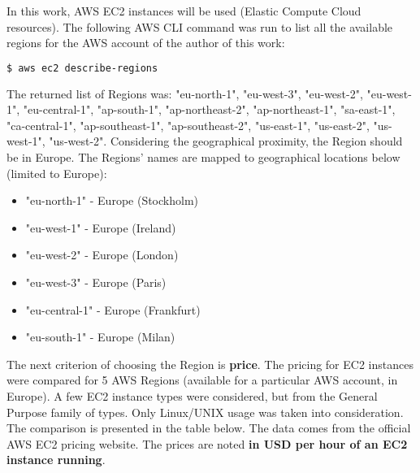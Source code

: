 In this work, AWS EC2 instances will be used (Elastic Compute Cloud resources). The following AWS CLI command was run to list all the available regions for the AWS account of the author of this work:
\begin{lstlisting}[basicstyle=\small,caption={A command of AWS CLI tool used to list all the available regions (for an AWS account)},captionpos=b,language=Bash,xleftmargin=1cm]
$ aws ec2 describe-regions
\end{lstlisting}

The returned list of Regions was: "eu-north-1", "eu-west-3", "eu-west-2", "eu-west-1", "eu-central-1", "ap-south-1", "ap-northeast-2", "ap-northeast-1", "sa-east-1", "ca-central-1", "ap-southeast-1", "ap-southeast-2", "us-east-1", "us-east-2", "us-west-1", "us-west-2". Considering the geographical proximity, the Region should be in Europe. The Regions' names are mapped to geographical locations below (limited to Europe)\cite{aws-region-map}:
\begin{itemize}
\item "eu-north-1" - Europe (Stockholm)
\item "eu-west-1" - Europe (Ireland)
\item "eu-west-2" - Europe (London)
\item "eu-west-3" - Europe (Paris)
\item "eu-central-1" - Europe (Frankfurt)
\item "eu-south-1" - Europe (Milan)
\end{itemize}

The next criterion of choosing the Region is \textbf{price}. The pricing for EC2 instances were compared for 5 AWS Regions (available for a particular AWS account, in Europe). A few EC2 instance types were considered, but from the General Purpose family of types. Only Linux/UNIX usage was taken into consideration. The comparison is presented in the table below. The data comes from the official AWS EC2 pricing website\cite{ec2-pricing}. The prices are noted \textbf{in USD per hour of an EC2 instance running}.

